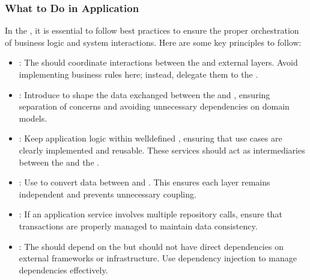 \documentclass[letterpaper,10pt,english]{sphinxhowto}
\begin{document}
\subsubsection{What to Do in Application}
\label{\detokenize{architecture/application/index:what-to-do-in-application}}
\sphinxAtStartPar
In the , it is essential to follow best practices to ensure the proper orchestration of business logic and system interactions. Here are some key principles to follow:
\begin{itemize}
\item {} 
\sphinxAtStartPar
{}:
The  should coordinate interactions between the  and external layers. Avoid implementing business rules here; instead, delegate them to the .

\item {} 
\sphinxAtStartPar
{}:
Introduce  to shape the data exchanged between the  and , ensuring separation of concerns and avoiding unnecessary dependencies on domain models.

\item {} 
\sphinxAtStartPar
{}:
Keep application logic within well\sphinxhyphen{}defined , ensuring that use cases are clearly implemented and reusable. These services should act as intermediaries between the  and the .

\item {} 
\sphinxAtStartPar
{}:
Use  to convert data between  and . This ensures each layer remains independent and prevents unnecessary coupling.

\item {} 
\sphinxAtStartPar
{}:
If an application service involves multiple repository calls, ensure that transactions are properly managed to maintain data consistency.

\item {} 
\sphinxAtStartPar
{}:
The  should depend on the  but should not have direct dependencies on external frameworks or infrastructure. Use dependency injection to manage dependencies effectively.


\end{itemize}
\end{document}
